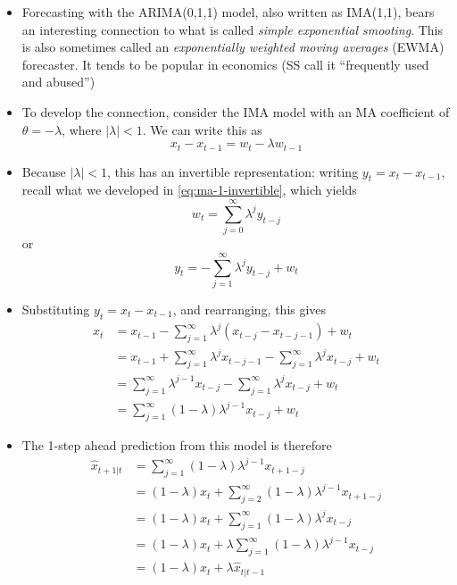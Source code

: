 \documentclass{article}
\begin{document}
\begin{itemize}
\item Forecasting with the ARIMA(0,1,1) model, also written as IMA(1,1), bears
  an interesting connection to what is called \emph{simple exponential 
    smooting}. This is also sometimes called an \emph{exponentially weighted
    moving averages} (EWMA) forecaster. It tends to be popular in economics (SS 
  call it ``frequently used and abused'')    

\item To develop the connection, consider the IMA model with an MA coefficient
  of $\theta = -\lambda$, where $|\lambda| < 1$. We can write this as 
  \[
  x_t - x_{t-1} = w_t - \lambda w_{t-1}
  \]

\item Because $|\lambda| < 1$, this has an invertible representation: writing 
  $y_t = x_t - x_{t-1}$, recall what we developed in \eqref{eq:ma-1-invertible},
  which yields
  \[
  w_t = \sum_{j=0}^\infty \lambda^j y_{t-j} 
  \]
  or
  \[
  y_t = -\sum_{j=1}^\infty \lambda^j y_{t-j} + w_t
  \]
  
\item Substituting $y_t = x_t - x_{t-1}$, and rearranging, this gives 
  \begin{align*}
  x_t &= x_{t-1} - \sum_{j=1}^\infty \lambda^j (x_{t-j} - x_{t-j-1}) + w_t \\ 
  &= x_{t-1} + \sum_{j=1}^\infty \lambda^j x_{t-j-1} - \sum_{j=1}^\infty
    \lambda^j x_{t-j} + w_t \\
  &= \sum_{j=1}^\infty \lambda^{j-1} x_{t-j} - \sum_{j=1}^\infty \lambda^j
    x_{t-j} + w_t \\
  &= \sum_{j=1}^\infty (1-\lambda) \lambda^{j-1} x_{t-j} + w_t 
  \end{align*}

\allowdisplaybreaks
\item The 1-step ahead prediction from this model is therefore  
  \begin{align*}
  \hat{x}_{t+1 | t} &= \sum_{j=1}^\infty (1-\lambda) \lambda^{j-1} x_{t+1-j} \\  
  &= (1-\lambda) x_t + \sum_{j=2}^\infty (1-\lambda) \lambda^{j-1} x_{t+1-j} 
    \\
  &= (1-\lambda) x_t + \sum_{j=1}^\infty (1-\lambda) \lambda^j x_{t-j} \\
  &= (1-\lambda) x_t + \lambda \sum_{j=1}^\infty (1-\lambda) \lambda^{j-1}
    x_{t-j} \\
  &= (1-\lambda) x_t + \lambda \hat{x}_{t | t-1}
  \end{align*}


\end{itemize}
\end{document}
